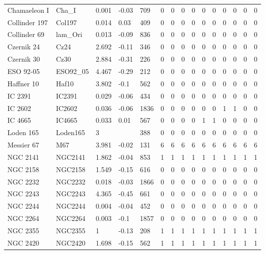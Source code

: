 \begin{longtable}[c]{|l l l l l || c c c c c | c c c c c|}
		Chamaeleon I & Cha\_I & 0.001 & -0.03 & 709 & 0 & 0 & 0 & 0 & 0 & 0 & 0 & 0 & 0 & 0\\
		Collinder 197 & Col197 & 0.014 & 0.03 & 409 & 0 & 0 & 0 & 0 & 0 & 0 & 0 & 0 & 0 & 0\\
		Collinder 69 & lam\_Ori & 0.013 & -0.09 & 836 & 0 & 0 & 0 & 0 & 0 & 0 & 0 & 0 & 0 & 0\\
		Czernik 24 & Cz24 & 2.692 & -0.11 & 346 & 0 & 0 & 0 & 0 & 0 & 0 & 0 & 0 & 0 & 0\\
		Czernik 30 & Cz30 & 2.884 & -0.31 & 226 & 0 & 0 & 0 & 0 & 0 & 0 & 0 & 0 & 0 & 0\\
		ESO 92-05 & ESO92\_05 & 4.467 & -0.29 & 212 & 0 & 0 & 0 & 0 & 0 & 0 & 0 & 0 & 0 & 0\\
		Haffner 10 & Haf10 & 3.802 & -0.1 & 562 & 0 & 0 & 0 & 0 & 0 & 0 & 0 & 0 & 0 & 0\\
		IC 2391 & IC2391 & 0.029 & -0.06 & 434 & 0 & 0 & 0 & 0 & 0 & 0 & 0 & 0 & 0 & 0\\
		\rowcolor{lightgray}
		IC 2602 & IC2602 & 0.036 & -0.06 & 1836 & 0 & 0 & 0 & 0 & 0 & 0 & 1 & 1 & 0 & 0\\
		\rowcolor{lightgray}
		IC 4665 & IC4665 & 0.033 & 0.01 & 567 & 0 & 0 & 0 & 0 & 1 & 1 & 0 & 0 & 0 & 0\\
		Loden 165 & Loden165 & 3 &  & 388 & 0 & 0 & 0 & 0 & 0 & 0 & 0 & 0 & 0 & 0\\
		\rowcolor{lightgray}
		Messier 67 & M67 & 3.981 & -0.02 & 131 & 6 & 6 & 6 & 6 & 6 & 6 & 6 & 6 & 6 & 6\\
		\rowcolor{lightgray}
		NGC 2141 & NGC2141 & 1.862 & -0.04 & 853 & 1 & 1 & 1 & 1 & 1 & 1 & 1 & 1 & 1 & 1\\
		NGC 2158 & NGC2158 & 1.549 & -0.15 & 616 & 0 & 0 & 0 & 0 & 0 & 0 & 0 & 0 & 0 & 0\\
		NGC 2232 & NGC2232 & 0.018 & -0.03 & 1866 & 0 & 0 & 0 & 0 & 0 & 0 & 0 & 0 & 0 & 0\\
		NGC 2243 & NGC2243 & 4.365 & -0.45 & 661 & 0 & 0 & 0 & 0 & 0 & 0 & 0 & 0 & 0 & 0\\
		NGC 2244 & NGC2244 & 0.004 & -0.04 & 452 & 0 & 0 & 0 & 0 & 0 & 0 & 0 & 0 & 0 & 0\\
		NGC 2264 & NGC2264 & 0.003 & -0.1 & 1857 & 0 & 0 & 0 & 0 & 0 & 0 & 0 & 0 & 0 & 0\\
		\rowcolor{lightgray}
		NGC 2355 & NGC2355 & 1 & -0.13 & 208 & 1 & 1 & 1 & 1 & 1 & 1 & 1 & 1 & 1 & 1\\
		\rowcolor{lightgray}
		NGC 2420 & NGC2420 & 1.698 & -0.15 & 562 & 1 & 1 & 1 & 1 & 1 & 1 & 1 & 1 & 1 & 1\\

\end{longtable}
